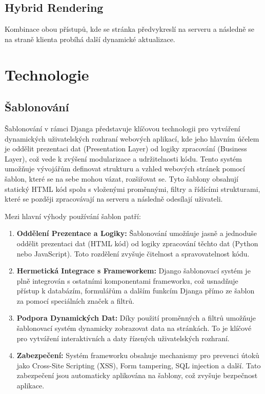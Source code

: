 \subsection{Hybrid Rendering}
\label{subsec:dev-request-processing-hybrid-rendering}
Kombinace obou přístupů, kde se stránka předvykreslí na serveru a následně se na straně klienta probíhá další dynamické aktualizace.

\section{Technologie}
\label{sec:dev-technology}

\subsection{Šablonování}
\label{subsec:dev-technology-templating}

Šablonování v rámci Djanga představuje klíčovou technologii pro vytváření dynamických uživatelských rozhraní webových aplikací, kde jeho hlavním účelem je oddělit prezentaci dat (Presentation Layer) od logiky zpracování (Business Layer), což vede k zvýšení modularizace a udržitelnosti kódu. Tento systém umožňuje vývojářům definovat strukturu a vzhled webových stránek pomocí šablon, které se na sebe mohou vázat, rozšiřovat se. Tyto šablony obsahují statický HTML kód spolu s vloženými proměnnými, filtry a řídícími strukturami, které se později zpracovávají na serveru a následně odesílají uživateli.

Mezi hlavní výhody používání šablon patří:
\begin{enumerate}
    \item \textbf{Oddělení Prezentace a Logiky:} Šablonování umožňuje jasně a jednoduše oddělit prezentaci dat (HTML kód) od logiky zpracování těchto dat (Python nebo JavaScript). Toto rozdělení zvyšuje čitelnost a spravovatelnost kódu.
    \item \textbf{Hermetická Integrace s Frameworkem:} Django šablonovací systém je plně integrován s ostatními komponentami frameworku, což usnadňuje přístup k databázím, formulářům a dalším funkcím Djanga přímo ze šablon za pomocí speciálních značek a filtrů.
    \item \textbf{Podpora Dynamických Dat:} Díky použití proměnných a filtrů umožňuje šablonovací systém dynamicky zobrazovat data na stránkách. To je klíčové pro vytváření interaktivních a daty řízených uživatelských rozhraní.
    \item \textbf{Zabezpečení:} Systém frameworku obsahuje mechanismy pro prevenci útoků jako Cross-Site Scripting (XSS), Form tampering, SQL injection a další. Tato zabezpečení jsou automaticky aplikována na šablony, což zvyšuje bezpečnost aplikace.
\end{enumerate}

